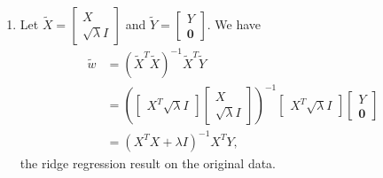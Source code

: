 \documentclass[submit]{harvardml}
\begin{document}
\begin{enumerate}[label=(\alph*)]
	\item Let $\tilde{X} = \begin{bmatrix} X \\ \sqrt{\lambda}I\end{bmatrix}$ and $\tilde{Y} = \begin{bmatrix} Y \\ \mathbf{0}\end{bmatrix}$. We have
	\begin{align*}
	\tilde{w} &= (\tilde{X}^T\tilde{X})^{-1}\tilde{X}^T\tilde{Y} \\
	&= \left(
	\begin{bmatrix} X^T \sqrt{\lambda}I\end{bmatrix}
	\begin{bmatrix} X \\ \sqrt{\lambda}I\end{bmatrix} 
	\right)^{-1}
	\begin{bmatrix} X^T \sqrt{\lambda}I\end{bmatrix}
	\begin{bmatrix} Y \\ \mathbf{0}\end{bmatrix} \\
	&= (X^TX + \lambda I)^{-1} X^TY,
	\end{align*}
	the ridge regression result on the original data.
\end{enumerate}
\end{document}
